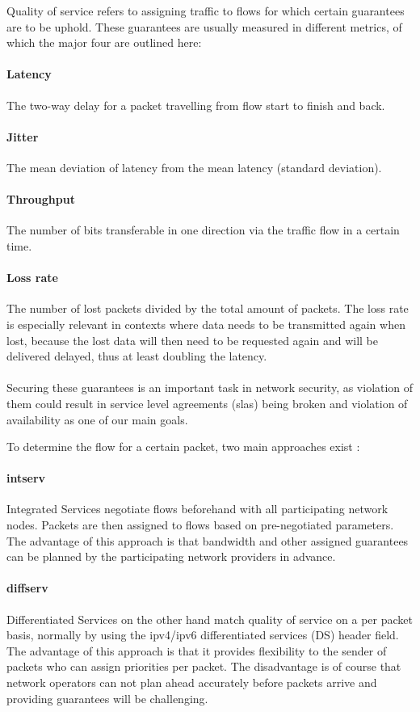 Quality of service \cite{qos, rfc791} refers to assigning traffic to flows for which certain guarantees are to be uphold. These guarantees are usually measured in different metrics, of which the major four are outlined here:
\paragraph{Latency} The two-way delay for a packet travelling from flow start to finish and back.
\paragraph{Jitter} The mean deviation of latency from the mean latency (standard deviation).
\paragraph{Throughput} The number of bits transferable in one direction via the traffic flow in a certain time.
\paragraph{Loss rate} The number of lost packets divided by the total amount of packets. The loss rate is especially relevant in contexts where data needs to be transmitted again when lost, because the lost data will then need to be requested again and will be delivered delayed, thus at least doubling the latency.

\paragraph{}Securing these guarantees is an important task in network security, as violation of them could result in service level agreements (\acrshort{sla}s) being broken and violation of availability as one of our main goals.

To determine the flow for a certain packet, two main approaches exist \cite{serv}:
\paragraph{\acrshort{intserv}} Integrated Services \cite{rfc1633} negotiate flows beforehand with all participating network nodes. Packets are then assigned to flows based on pre-negotiated parameters. The advantage of this approach is that bandwidth and other assigned guarantees can be planned by the participating network providers in advance.
\paragraph{\acrshort{diffserv}} Differentiated Services \cite{rfc2474} on the other hand match quality of service on a per packet basis, normally by using the \acrshort{ipv4}/\acrshort{ipv6} differentiated services (DS) header field. The advantage of this approach is that it provides flexibility to the sender of packets who can assign priorities per packet. The disadvantage is of course that network operators can not plan ahead accurately before packets arrive and providing guarantees will be challenging.

